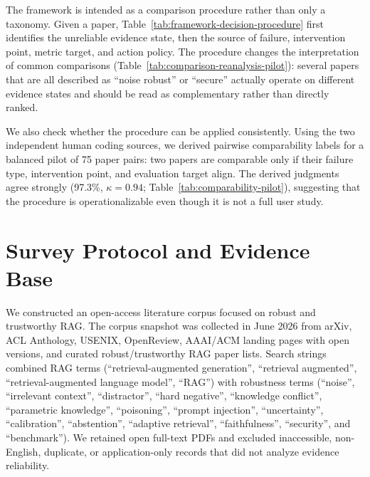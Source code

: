 \documentclass[11pt]{article}
\begin{document}




The framework is intended as a comparison procedure rather than only a taxonomy. Given a paper, Table~\ref{tab:framework-decision-procedure} first identifies the unreliable evidence state, then the source of failure, intervention point, metric target, and action policy. The procedure changes the interpretation of common comparisons (Table~\ref{tab:comparison-reanalysis-pilot}): several papers that are all described as ``noise robust'' or ``secure'' actually operate on different evidence states and should be read as complementary rather than directly ranked.

We also check whether the procedure can be applied consistently. Using the two independent human coding sources, we derived pairwise comparability labels for a balanced pilot of 75 paper pairs: two papers are comparable only if their failure type, intervention point, and evaluation target align. The derived judgments agree strongly (97.3\%, $\kappa=0.94$; Table~\ref{tab:comparability-pilot}), suggesting that the procedure is operationalizable even though it is not a full user study.

\section{Survey Protocol and Evidence Base}
\label{sec:protocol}




We constructed an open-access literature corpus focused on robust and trustworthy RAG. The corpus snapshot was collected in June 2026 from arXiv, ACL Anthology, USENIX, OpenReview, AAAI/ACM landing pages with open versions, and curated robust/trustworthy RAG paper lists. Search strings combined RAG terms (``retrieval-augmented generation'', ``retrieval augmented'', ``retrieval-augmented language model'', ``RAG'') with robustness terms (``noise'', ``irrelevant context'', ``distractor'', ``hard negative'', ``knowledge conflict'', ``parametric knowledge'', ``poisoning'', ``prompt injection'', ``uncertainty'', ``calibration'', ``abstention'', ``adaptive retrieval'', ``faithfulness'', ``security'', and ``benchmark''). We retained open full-text PDFs and excluded inaccessible, non-English, duplicate, or application-only records that did not analyze evidence reliability.
\end{document}
